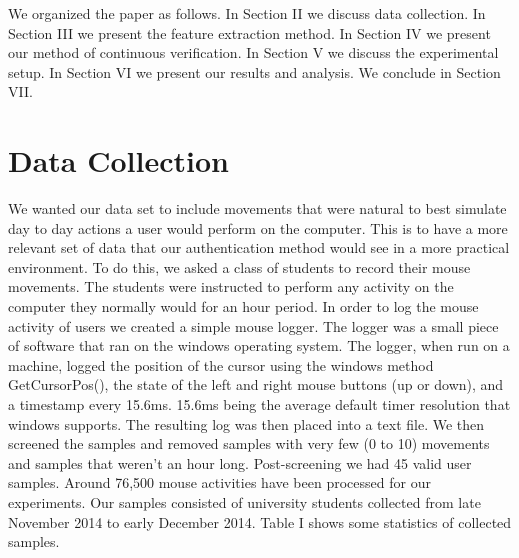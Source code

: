 \documentclass[conference]{IEEEtran}
\begin{document}
We organized the paper as follows. In Section II we discuss data collection. In Section III we present the feature extraction method. In Section IV we present our method of continuous verification. In Section V we discuss the experimental setup. In Section VI we present our results and analysis. We conclude in Section VII.   
     





\section{Data Collection}
We wanted our data set to include movements that were natural to best simulate day to day actions a user would perform on the computer. This is to have a more relevant set of data that our authentication method would see in a more practical environment. To do this, we asked a class of students to record their mouse movements. The students were instructed to perform any activity on the computer they normally would for an hour period.
	In order to log the mouse activity of users we created a simple mouse logger.  The logger was a small piece of software that ran on the windows operating system. The logger, when run on a machine, logged the position of the cursor using the windows method GetCursorPos(), the state of the left and right mouse buttons (up or down), and a timestamp every 15.6ms. 15.6ms being the average default timer resolution that windows supports. The resulting log was then placed into a text file. 
We then screened the samples and removed samples with very few (0 to 10) movements and samples that weren't an hour long. Post-screening we had 45 valid user samples. Around 76,500 mouse activities have been processed for our experiments. Our samples consisted of university students collected from late November 2014 to early December 2014. Table I shows some statistics of collected samples.



\bgroup
{}
\def\arraystretch{1.5}
\egroup
\end{document}

